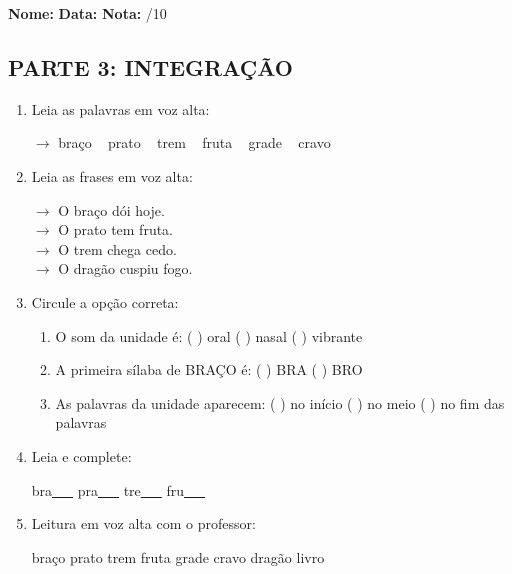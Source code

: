 \begin{exercicio}

\noindent\textbf{Nome:} \underline{\hspace{3.2cm}} \quad \textbf{Data:} \underline{\hspace{1.6cm}} \quad \textbf{Nota:} \underline{\hspace{0.9cm}}/10


\subsection*{PARTE 3: INTEGRAÇÃO}

\begin{enumerate}[resume]

  \item Leia as palavras em voz alta:
  \begin{center}
  $\rightarrow$ braço ~ prato ~ trem ~ fruta ~ grade ~ cravo
  \end{center}

  \item Leia as frases em voz alta:
  \begin{center}
  $\rightarrow$ O braço dói hoje.\\
  $\rightarrow$ O prato tem fruta.\\
  $\rightarrow$ O trem chega cedo.\\
  $\rightarrow$ O dragão cuspiu fogo.\\
  \end{center}

  \item Circule a opção correta:
  \begin{enumerate}[label=(\alph*)]

    \item O som da unidade é: ( ) oral ( ) nasal ( ) vibrante

    \item A primeira sílaba de BRAÇO é: ( ) BRA ( ) BRO

    \item As palavras da unidade aparecem: ( ) no início ( ) no meio ( ) no fim das palavras

  \end{enumerate}

  \item Leia e complete:
  \begin{center}
  bra\underline{~~~} \quad pra\underline{~~~} \quad tre\underline{~~~} \quad fru\underline{~~~}
  \end{center}

  \item Leitura em voz alta com o professor:
  \begin{center}
  braço \quad prato \quad trem \quad fruta \quad grade \quad cravo \quad dragão \quad livro
  \end{center}

\end{enumerate}

\end{exercicio}

